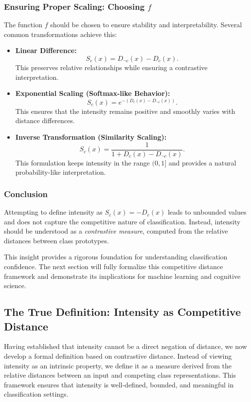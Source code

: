\documentclass[12pt]{article}
\begin{document}
\subsubsection{Ensuring Proper Scaling: Choosing \( f \)}

The function \( f \) should be chosen to ensure stability and interpretability. Several common transformations achieve this:

\begin{itemize}
    \item \textbf{Linear Difference:}  
    \[
    S_c(x) = D_{\neg c}(x) - D_c(x).
    \]
    This preserves relative relationships while ensuring a contrastive interpretation.
    
    \item \textbf{Exponential Scaling (Softmax-like Behavior):}  
    \[
    S_c(x) = e^{-(D_c(x) - D_{\neg c}(x))}.
    \]
    This ensures that the intensity remains positive and smoothly varies with distance differences.
    
    \item \textbf{Inverse Transformation (Similarity Scaling):}  
    \[
    S_c(x) = \frac{1}{1 + D_c(x) - D_{\neg c}(x)}.
    \]
    This formulation keeps intensity in the range \( (0,1] \) and provides a natural probability-like interpretation.
\end{itemize}

\subsubsection{Conclusion}

Attempting to define intensity as \( S_c(x) = -D_c(x) \) leads to unbounded values and does not capture the competitive nature of classification. Instead, intensity should be understood as a \textit{contrastive measure}, computed from the relative distances between class prototypes.

This insight provides a rigorous foundation for understanding classification confidence. The next section will fully formalize this competitive distance framework and demonstrate its implications for machine learning and cognitive science.

\subsection{The True Definition: Intensity as Competitive Distance}

Having established that intensity cannot be a direct negation of distance, we now develop a formal definition based on contrastive distance. Instead of viewing intensity as an intrinsic property, we define it as a measure derived from the relative distances between an input and competing class representations. This framework ensures that intensity is well-defined, bounded, and meaningful in classification settings.
\end{document}
